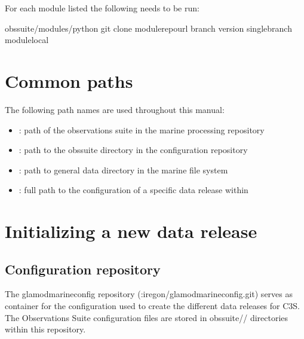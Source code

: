 \documentclass[letterpaper,10pt,english]{sphinxmanual}
\begin{document}
For each module listed the following needs to be run:

\begin{sphinxVerbatim}[commandchars=\\\{\}]
 obs\PYGZhy{}suite/modules/python
git clone module\PYGZus{}repo\PYGZus{}url \PYGZhy{}\PYGZhy{}branch version \PYGZhy{}\PYGZhy{}single\PYGZhy{}branch module\PYGZus{}local
\end{sphinxVerbatim}


\chapter{Common paths}
\label{\detokenize{index:common-paths}}
The following path names are used throughout this manual:
\begin{itemize}
\item {} 
: path of the observations suite in the marine processing repository

\item {} 
: path to the obs\sphinxhyphen{}suite directory in the configuration repository

\item {} 
: path to general data directory in the marine file system

\item {} 
: full path to the configuration of a specific data release
within 

\end{itemize}


\chapter{Initializing a new data release}
\label{\detokenize{index:initializing-a-new-data-release}}

\section{Configuration repository}
\label{\detokenize{index:configuration-repository}}
The glamod\sphinxhyphen{}marine\sphinxhyphen{}config repository
(:iregon/glamod\sphinxhyphen{}marine\sphinxhyphen{}config.git) serves as container for the
configuration used to create the different data releases for C3S. The
Observations Suite configuration files are stored in
obs\sphinxhyphen{}suite/\sphinxhyphen{}/ directories within this repository.
\end{document}
